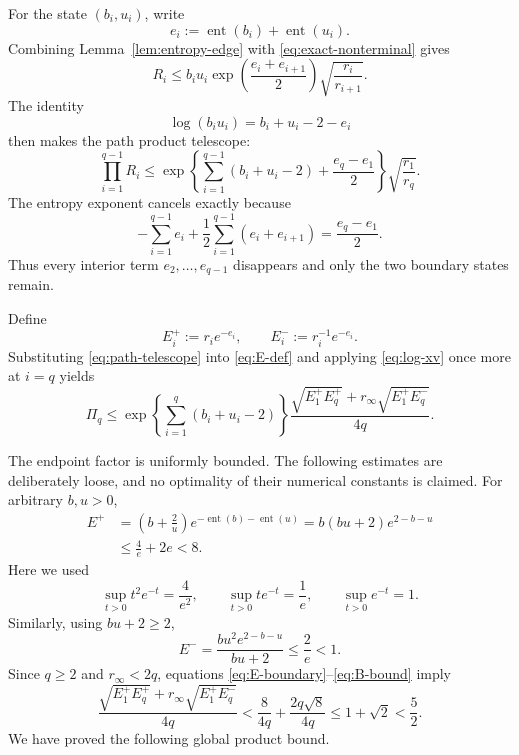 \documentclass[11pt]{article}
\theoremstyle{definition}
\theoremstyle{remark}
\newcommand{\invprod}{\Pi}
\newcommand{\ent}{\operatorname{ent}}
\begin{document}
For the state \((b_i,u_i)\), write
\begin{equation}
  e_i:=\ent(b_i)+\ent(u_i).
  \label{eq:si}
\end{equation}
Combining Lemma~\ref{lem:entropy-edge} with
\eqref{eq:exact-nonterminal} gives
\begin{equation}
 R_i
 \le b_i u_i
    \exp\left(\frac{e_i+e_{i+1}}2\right)
    \sqrt{\frac{r_i}{r_{i+1}}}.
 \label{eq:Ki-entropy}
\end{equation}
The identity
\begin{equation}
 \log(b_i u_i)=b_i+u_i-2-e_i
 \label{eq:log-xv}
\end{equation}
then makes the path product telescope:
\begin{equation}
 \prod_{i=1}^{q-1}R_i
 \le
 \exp\left\{
   \sum_{i=1}^{q-1}(b_i+u_i-2)
   +\frac{e_q-e_1}{2}
 \right\}
 \sqrt{\frac{r_1}{r_q}}.
 \label{eq:path-telescope}
\end{equation}
The entropy exponent cancels exactly because
\[
 -\sum_{i=1}^{q-1}e_i
 +\frac12\sum_{i=1}^{q-1}(e_i+e_{i+1})
 =\frac{e_q-e_1}{2}.
\]
Thus every interior term
\(e_2,\ldots,e_{q-1}\) disappears and only the two
boundary states remain.

Define
\begin{equation}
 E_i^+:=r_i e^{-e_i},\qquad
 E_i^-:=r_i^{-1}e^{-e_i}.
 \label{eq:A-B}
\end{equation}
Substituting \eqref{eq:path-telescope} into \eqref{eq:E-def} and applying
\eqref{eq:log-xv} once more at \(i=q\) yields
\begin{equation}
 \invprod_q
 \le
 \exp\left\{\sum_{i=1}^q(b_i+u_i-2)\right\}
 \frac{\sqrt{E_1^+E_q^+}
       +r_\infty\sqrt{E_1^+E_q^-}}{4q}.
 \label{eq:E-boundary}
\end{equation}

The endpoint factor is uniformly bounded.  The following estimates are
deliberately loose, and no optimality of their numerical constants is
claimed.  For arbitrary \(b,u>0\),
\begin{equation}
\begin{aligned}
 E^+
 &=\left(b+\frac2u\right)e^{-\ent(b)-\ent(u)}
 =b(bu+2)e^{2-b-u}\\
 &\le \frac4e+2e<8.
\end{aligned}
\label{eq:A-bound}
\end{equation}
Here we used
\[
 \sup_{t>0}t^2e^{-t}=\frac4{e^2},
 \qquad
 \sup_{t>0}te^{-t}=\frac1e,
 \qquad
 \sup_{t>0}e^{-t}=1.
\]
Similarly, using \(bu+2\ge2\),
\begin{equation}
 E^-
 =\frac{bu^2e^{2-b-u}}{bu+2}
 \le\frac2e<1.
 \label{eq:B-bound}
\end{equation}
Since \(q\ge2\) and \(r_\infty<2q\), equations
\eqref{eq:E-boundary}--\eqref{eq:B-bound} imply
\begin{equation}
 \frac{\sqrt{E_1^+E_q^+}
       +r_\infty\sqrt{E_1^+E_q^-}}{4q}
 <\frac8{4q}+\frac{2q\sqrt8}{4q}
 \le1+\sqrt2<\frac52.
 \label{eq:boundary-constant}
\end{equation}
We have proved the following global product bound.
\end{document}

